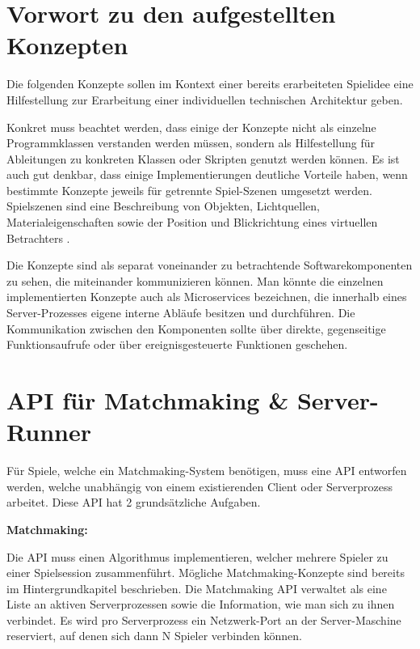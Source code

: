 \section{Vorwort zu den aufgestellten Konzepten}

Die folgenden Konzepte sollen im Kontext einer bereits erarbeiteten Spielidee eine Hilfestellung zur Erarbeitung einer individuellen technischen Architektur geben.

Konkret muss beachtet werden, dass einige der Konzepte nicht als einzelne Programmklassen verstanden werden müssen, sondern als Hilfestellung für Ableitungen zu konkreten Klassen oder Skripten genutzt werden können. Es ist auch gut denkbar, dass einige Implementierungen deutliche Vorteile haben, wenn bestimmte Konzepte jeweils für getrennte Spiel-Szenen umgesetzt werden. Spielszenen sind eine Beschreibung von Objekten, Lichtquellen, Materialeigenschaften sowie der Position und Blickrichtung eines virtuellen Betrachters \cite{D.Polancec.2017}.

Die Konzepte sind als separat voneinander zu betrachtende Softwarekomponenten zu sehen, die miteinander kommunizieren können. Man könnte die einzelnen implementierten Konzepte auch als Microservices \cite{Thones.2015} bezeichnen, die innerhalb eines Server-Prozesses eigene interne Abläufe besitzen und durchführen. Die Kommunikation zwischen den Komponenten sollte über direkte, gegenseitige Funktionsaufrufe oder über ereignisgesteuerte Funktionen \cite{Michelson.2006} geschehen.

\section{API für Matchmaking \& Server-Runner}

Für Spiele, welche ein Matchmaking-System benötigen, muss eine API entworfen werden, welche unabhängig von einem existierenden Client oder Serverprozess arbeitet. Diese API hat 2 grundsätzliche Aufgaben. 

\textbf{Matchmaking:}

Die API muss einen Algorithmus implementieren, welcher mehrere Spieler zu einer Spielsession zusammenführt. Mögliche Matchmaking-Konzepte sind bereits im Hintergrundkapitel beschrieben. Die Matchmaking API verwaltet als eine Liste an aktiven Serverprozessen sowie die Information, wie man sich zu ihnen verbindet. Es wird pro Serverprozess ein Netzwerk-Port an der Server-Maschine reserviert, auf denen sich dann N Spieler verbinden können.

